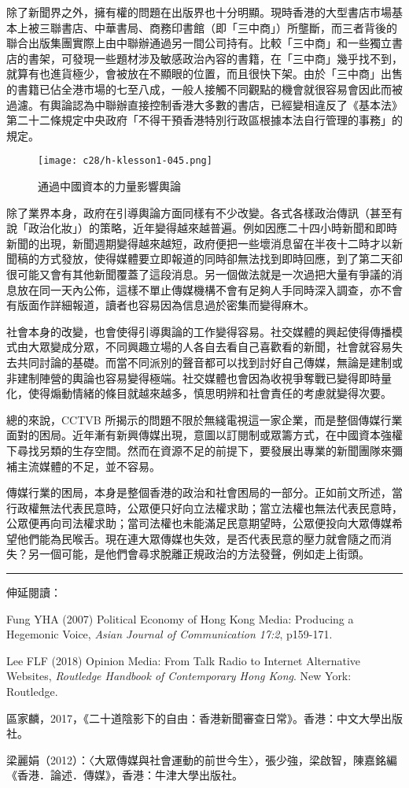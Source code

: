 除了新聞界之外，擁有權的問題在出版界也十分明顯。現時香港的大型書店市場基本上被三聯書店、中華書局、商務印書館（即「三中商」）所壟斷，而三者背後的聯合出版集團實際上由中聯辦通過另一間公司持有。比較「三中商」和一些獨立書店的書架，可發現一些題材涉及敏感政治內容的書籍，在「三中商」幾乎找不到，就算有也進貨極少，會被放在不顯眼的位置，而且很快下架。由於「三中商」出售的書籍已佔全港市場的七至八成，一般人接觸不同觀點的機會就很容易會因此而被過濾。有輿論認為中聯辦直接控制香港大多數的書店，已經變相違反了《基本法》第二十二條規定中央政府「不得干預香港特別行政區根據本法自行管理的事務」的規定。

\begin{figure}[htbp]
    \centering
    \texttt{[image: c28/h-klesson1-045.png]}
    \caption{通過中國資本的力量影響輿論} 
\end{figure}

除了業界本身，政府在引導輿論方面同樣有不少改變。各式各樣政治傳訊（甚至有說「政治化妝」）的策略，近年變得越來越普遍。例如因應二十四小時新聞和即時新聞的出現，新聞週期變得越來越短，政府便把一些壞消息留在半夜十二時才以新聞稿的方式發放，使得媒體要立即報道的同時卻無法找到即時回應，到了第二天卻很可能又會有其他新聞覆蓋了這段消息。另一個做法就是一次過把大量有爭議的消息放在同一天內公佈，這樣不單止傳媒機構不會有足夠人手同時深入調查，亦不會有版面作詳細報道，讀者也容易因為信息過於密集而變得麻木。

社會本身的改變，也會使得引導輿論的工作變得容易。社交媒體的興起使得傳播模式由大眾變成分眾，不同興趣立場的人各自去看自己喜歡看的新聞，社會就容易失去共同討論的基礎。而當不同派別的聲音都可以找到討好自己傳媒，無論是建制或非建制陣營的輿論也容易變得極端。社交媒體也會因為收視爭奪戰已變得即時量化，使得煽動情緒的條目就越來越多，慎思明辨和社會責任的考慮就變得次要。

總的來說，CCTVB 所揭示的問題不限於無綫電視這一家企業，而是整個傳媒行業面對的困局。近年漸有新興傳媒出現，意圖以訂閱制或眾籌方式，在中國資本強權下尋找另類的生存空間。然而在資源不足的前提下，要發展出專業的新聞團隊來彌補主流媒體的不足，並不容易。

傳媒行業的困局，本身是整個香港的政治和社會困局的一部分。正如前文所述，當行政權無法代表民意時，公眾便只好向立法權求助；當立法權也無法代表民意時，公眾便再向司法權求助；當司法權也未能滿足民意期望時，公眾便投向大眾傳媒希望他們能為民喉舌。現在連大眾傳媒也失效，是否代表民意的壓力就會隨之而消失？另一個可能，是他們會尋求脫離正規政治的方法發聲，例如走上街頭。

\rule[-10pt]{15cm}{0.05em}

伸延閱讀：

Fung YHA (2007) Political Economy of Hong Kong Media: Producing a Hegemonic Voice, \textit{Asian Journal of Communication 17:2}, p159-171.

Lee FLF (2018) Opinion Media: From Talk Radio to Internet Alternative Websites, \textit{Routledge Handbook of Contemporary Hong Kong}. New York: Routledge.

區家麟，2017，《二十道陰影下的自由：香港新聞審查日常》。香港：中文大學出版社。

梁麗娟（2012）：〈大眾傳媒與社會運動的前世今生〉，張少強，梁啟智，陳嘉銘編《香港．論述．傳媒》，香港：牛津大學出版社。